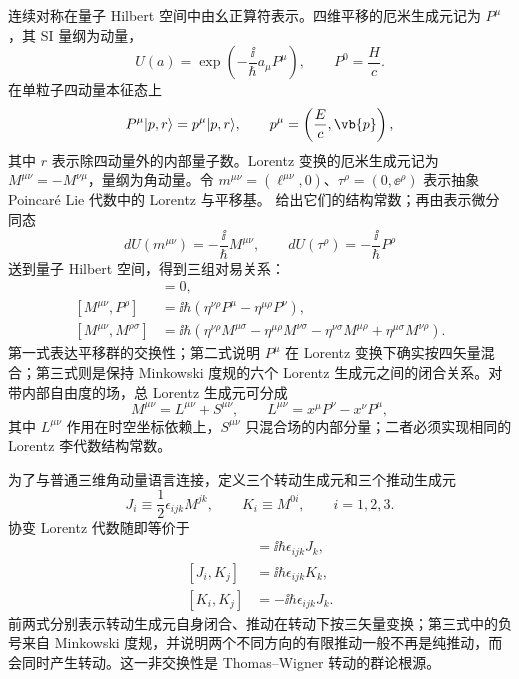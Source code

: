连续对称在量子 Hilbert 空间中由幺正算符表示。四维平移的厄米生成元记为 $P^\mu$，其 SI 量纲为动量，
\begin{equation}
 U(a)=\exp\!\left(-\frac{\ii}{\hbar}a_\mu P^\mu\right),
 \qquad P^0=\frac{H}{c}.
 \label{eq:translation-unitary-r15}
\end{equation}
在单粒子四动量本征态上
\begin{equation}
 P^\mu|p,r\rangle=p^\mu|p,r\rangle,
 \qquad
 p^\mu=\left(\frac{E}{c},\vb{p}\right),
 \label{eq:P-eigenvalue-r15}
\end{equation}
其中 $r$ 表示除四动量外的内部量子数。Lorentz 变换的厄米生成元记为 $M^{\mu\nu}=-M^{\nu\mu}$，量纲为角动量。令 $m^{\mu\nu}=(\ell^{\mu\nu},0)$、$\tau^\rho=(0,\ee^\rho)$ 表示抽象 Poincar\'e Lie 代数中的 Lorentz 与平移基。 给出它们的结构常数；再由表示微分同态
\begin{equation*}
 dU(m^{\mu\nu})=-\frac{\ii}{\hbar}M^{\mu\nu},
 \qquad
 dU(\tau^\rho)=-\frac{\ii}{\hbar}P^\rho
\end{equation*}
送到量子 Hilbert 空间，得到三组对易关系：
\begin{align}
 [P^\mu,P^\nu]&=0,
 \label{eq:poincare-pp}\\
 [M^{\mu\nu},P^\rho]
 &=\ii\hbar\left(
 \eta^{\nu\rho}P^\mu-\eta^{\mu\rho}P^\nu
 \right),
 \label{eq:poincare-mp}\\
 [M^{\mu\nu},M^{\rho\sigma}]
 &=\ii\hbar\left(
 \eta^{\nu\rho}M^{\mu\sigma}
 -\eta^{\mu\rho}M^{\nu\sigma}
 -\eta^{\nu\sigma}M^{\mu\rho}
 +\eta^{\mu\sigma}M^{\nu\rho}
 \right).
 \label{eq:poincare-mm}
\end{align}
第一式表达平移群的交换性；第二式说明 $P^\mu$ 在 Lorentz 变换下确实按四矢量混合；第三式则是保持 Minkowski 度规的六个 Lorentz 生成元之间的闭合关系。对带内部自由度的场，总 Lorentz 生成元可分成
\begin{equation}
 M^{\mu\nu}=L^{\mu\nu}+S^{\mu\nu},
 \qquad
 L^{\mu\nu}=x^\mu P^\nu-x^\nu P^\mu,
 \label{eq:orbital-plus-spin}
\end{equation}
其中 $L^{\mu\nu}$ 作用在时空坐标依赖上，$S^{\mu\nu}$ 只混合场的内部分量；二者必须实现相同的 Lorentz 李代数结构常数。

为了与普通三维角动量语言连接，定义三个转动生成元和三个推动生成元
\begin{equation}
 J_i\equiv\frac12\epsilon_{ijk}M^{jk},
 \qquad
 K_i\equiv M^{0i},
 \qquad i=1,2,3.
 \label{eq:rotation-boost-generators-dp34}
\end{equation}
协变 Lorentz 代数随即等价于
\begin{align}
 [J_i,J_j]&=\ii\hbar\epsilon_{ijk}J_k,\\
 [J_i,K_j]&=\ii\hbar\epsilon_{ijk}K_k,\\
 [K_i,K_j]&=-\ii\hbar\epsilon_{ijk}J_k.
 \label{eq:JK-algebra}
\end{align}
前两式分别表示转动生成元自身闭合、推动在转动下按三矢量变换；第三式中的负号来自 Minkowski 度规，并说明两个不同方向的有限推动一般不再是纯推动，而会同时产生转动。这一非交换性是 Thomas--Wigner 转动的群论根源。

